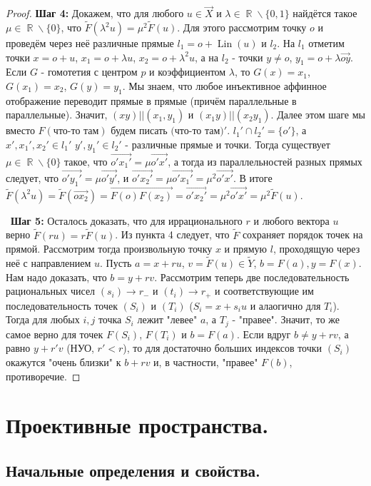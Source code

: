 \documentclass[a4paper,100pt]{article}
\theoremstyle{indented}
\theoremstyle{definition}
\theoremstyle{remark}
\DeclareMathOperator{\RR}{\mathbb{R}}
\DeclareMathOperator{\Lin}{Lin}
\begin{document}
\begin{proof}
    \textbf{Шаг 4:} Докажем, что для любого $u \in \vec{X}$ и $\lambda \in \RR \backslash \{0, 1\}$ найдётся такое $\mu \in \RR \backslash \{0\}$, что $\tilde{F}(\lambda^2 u)=\mu^2 \tilde{F}(u)$. Для этого рассмотрим точку $o$ и проведём через неё различные прямые $l_1=o+\Lin(u)$ и $l_2$. На $l_1$ отметим точки $x=o+u$, $x_1=o+\lambda u$, $x_2=o+\lambda^2 u$, а на $l_2$ - точки $y \neq o$, $y_1=o+\lambda \vec{oy}$. Если $G$ - гомотетия с центром $p$ и коэффициентом $\lambda$, то $G(x)=x_1$, $G(x_1)=x_2$, $G(y)=y_1$. Мы знаем, что любое инъективное аффинное отображение переводит прямые в прямые (причём параллельные в параллельные). Значит, $(xy) || (x_1, y_1)$ и $(x_1y) || (x_2y_1)$. Далее этом шаге мы вместо $F(\text{что-то там})$ будем писать $\text{(что-то там)}'$. $l_1' \cap l_2' = \{o'\}$, а $x', x_1', x_2' \in l_1'$ $y', y_1' \in l_2'$ - различные прямые и точки. Тогда существует $\mu \in \RR \backslash \{0\}$ такое, что $\vec{o'x_1'}=\mu \vec{o'x'}$, а тогда из параллельностей разных прямых следует, что $\vec{o'y_1'}=\mu \vec{o'y'}$, и $\vec{o'x_2'}=\mu \vec{o'x_1'}=\mu^2 \vec{o'x'}$. В итоге $\tilde{F}(\lambda^2 u)=\tilde{F}(\vec{ox_2})=\overrightarrow{F(o)F(x_2)}=\vec{o'x_2'}=\mu^2 \vec{o'x'}=\mu^2 \tilde{F}(u)$. 

    \
    \textbf{Шаг 5:} Осталось доказать, что для иррационального $r$  и любого вектора $u$ верно $\tilde{F}(ru)=r\tilde{F}(u)$. Из пункта 4 следует, что $\tilde{F}$ сохраняет порядок точек на прямой. Рассмотрим тогда произвольную точку $x$ и прямую $l$, проходящую через неё с направлением $u$. Пусть $a=x+ru$, $v=\tilde{F}(u) \in \tilde{Y}$, $b=F(a), y=F(x)$. Нам надо доказать, что $b=y+rv$. Рассмотрим теперь две последовательность рациональных чисел $(s_i) \rightarrow r_-$ и $(t_i) \rightarrow r_+$ и соответствующие им последовательность точек $(S_i)$ и $(T_i)$ ($S_i=x+s_iu$ и алаогично для $T_i$). Тогда для любых $i, j$ точка $S_i$ лежит "левее" $a$, а $T_j$ - "правее". Значит, то же самое верно для точек $F(S_i)$, $F(T_i)$ и $b=F(a)$. Если вдруг $b \neq y+rv$, а равно $y+r'v$ (НУО, $r'<r$), то для достаточно больших индексов точки $(S_i)$ окажутся "очень близки" к $b+rv$ и, в частности, "правее" $F(b)$, противоречие.
\end{proof}

\section{Проективные пространства.}

\subsection{Начальные определения и свойства.}
\end{document}
